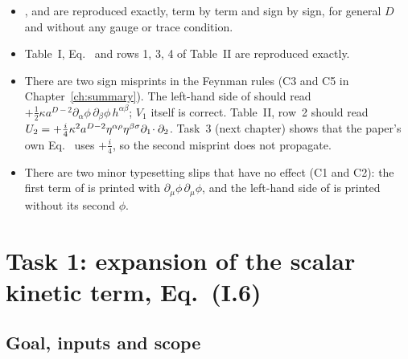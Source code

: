 \begin{resultbox}
\begin{itemize}[leftmargin=1.2em,itemsep=1pt]
\item {},  and  are reproduced exactly, term by term and
sign by sign, for general $D$ and without any gauge or trace condition.
\item Table~I, Eq.~ and rows 1, 3, 4 of Table~II are reproduced
exactly.
\item There are two sign misprints in the Feynman rules (C3 and C5 in Chapter~\ref{ch:summary}). The left-hand side of
 should read $+\tfrac12\kappa a^{D-2}\partial_\alpha\phi\,\partial_\beta\phi\,h^{\alpha\beta}$;
$V_1$ itself is correct. Table~II, row~2 should read
$U_2=+\tfrac i4\kappa^2a^{D-2}\eta^{\alpha\rho}\eta^{\beta\sigma}\partial_1\!\cdot\partial_2$.
Task~3 (next chapter) shows that the paper's own Eq.~ uses
$+\tfrac i4$, so the second misprint does not propagate.
\item There are two minor typesetting slips that have no effect (C1 and C2): the first term of
 is printed with $\partial_\mu\phi\,\partial_\mu\phi$, and the
left-hand side of  is printed without its second $\phi$.
\end{itemize}
\end{resultbox}

\section{Task 1: expansion of the scalar kinetic term, Eq.~(I.6)}
\label{sec:ch1-task1}

\subsection{Goal, inputs and scope}

